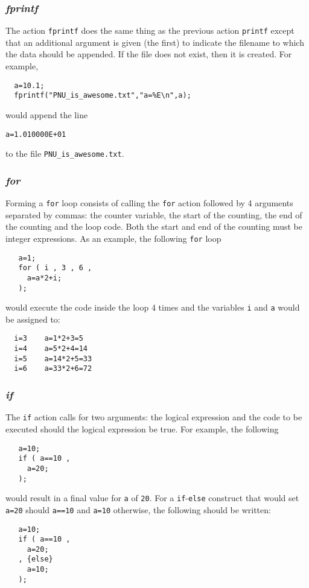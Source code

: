 \documentclass{warpdoc}
\begin{document}
\subsubsection{\emph{fprintf}}

The action \verb|fprintf| does the same thing as the previous action \verb|printf| except
that an additional argument is given (the first) to indicate the filename to which
the data should be appended. If the file does not exist, then it is created.
 For example,
%
\begin{verbatim}
  a=10.1;
  fprintf("PNU_is_awesome.txt","a=%E\n",a);
\end{verbatim}
%
would append the line
%
\begin{verbatim}
a=1.010000E+01
\end{verbatim}
%
to the file \verb|PNU_is_awesome.txt|.


\subsubsection{\emph{for}}

Forming a \verb|for| loop consists of calling the \verb|for|
action followed by 4 arguments separated by commas: the counter variable, the start of
the counting, the end of the counting and the loop code. Both
the start and end of the counting must be integer expressions.
As an example, the following \verb|for| loop
%
\begin{verbatim}
   a=1;
   for ( i , 3 , 6 ,
     a=a*2+i;
   );
\end{verbatim}
%
would execute the code inside the loop 4 times and the variables
\verb|i| and \verb|a| would be assigned to:
%
\begin{verbatim}
  i=3    a=1*2+3=5
  i=4    a=5*2+4=14
  i=5    a=14*2+5=33
  i=6    a=33*2+6=72
\end{verbatim}
%

\subsubsection{\emph{if}}

The \verb|if| action  calls for
two arguments: the logical expression and the code to
be executed should the logical expression be true.
For example, the following
%
\begin{verbatim}
   a=10;
   if ( a==10 ,
     a=20;
   );
\end{verbatim}
%
would result in a final value for \verb|a| of \verb|20|. For a \verb|if|-\verb|else| construct that would set \verb|a=20| should \verb|a==10| and \verb|a=10| otherwise, the following should be written:
%
\begin{verbatim}
   a=10;
   if ( a==10 ,
     a=20;
   , {else}
     a=10;
   );
\end{verbatim}
%
\end{document}
